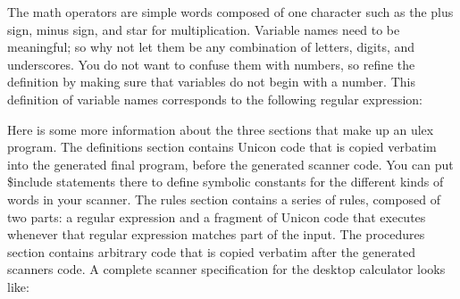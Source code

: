 The math operators are simple {\textquotedbl}words{\textquotedbl}
composed of one character such as the plus sign, minus sign, and star
for multiplication. Variable names need to be meaningful; so why not
let them be any combination of letters, digits, and underscores. You do
not want to confuse them with numbers, so refine the definition by
making sure that variables do not begin with a number. This definition
of variable names corresponds to the following regular expression: 

\iconcode{
[a-zA-Z\_][a-zA-Z0-9\_]*}

Here is some more information about the three sections that make up an
\textsf{ulex} program. The definitions section contains Unicon code
that is copied verbatim into the generated final program, before the
generated scanner code. You can put \textsf{\$include} statements there
to define symbolic constants for the different kinds of words in your
scanner. The rules section contains a series of rules, composed of two
parts: a regular expression and a fragment of Unicon code that executes
whenever that regular expression matches part of the input. The
procedures section contains arbitrary code that is copied verbatim
after the generated scanner{\textquotesingle}s code. A complete scanner
specification for the desktop calculator looks like:


